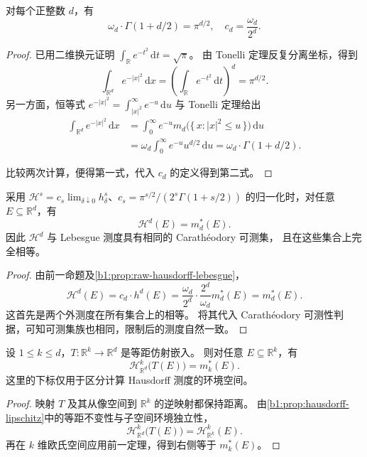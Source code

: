 \begin{proposition}[整数维归一化]\label{b1:prop:hausdorff-normalization}
对每个正整数 \(d\)，有
\[
 \omega_d\cdot \Gamma(1+d/2)=\pi^{d/2},\quad c_d=\frac{\omega_d}{2^d}.
\]
\end{proposition}
\begin{proof}
已用二维换元证明
\(\int_{\mathbb R}e^{-t^2}\,\mathrm dt=\sqrt\pi\)。
由 Tonelli 定理反复分离坐标，得到
\[
 \int_{\mathbb R^d}e^{-|x|^2}\,\mathrm dx
 =\left(\int_{\mathbb R}e^{-t^2}\,\mathrm dt\right)^d
 =\pi^{d/2}.
\]
另一方面，恒等式
\(e^{-|x|^2}=\int_{|x|^2}^\infty e^{-u}\,\mathrm du\)
与 Tonelli 定理给出
\[
 \begin{aligned}
 \int_{\mathbb R^d}e^{-|x|^2}\,\mathrm dx
 &=\int_0^\infty e^{-u}
      m_d\bigl(\{\,x:|x|^2\leq u\,\}\bigr)\,\mathrm du\\
 &=\omega_d\int_0^\infty e^{-u}u^{d/2}\,\mathrm du
 =\omega_d\cdot \Gamma(1+d/2).
 \end{aligned}
\]

比较两次计算，便得第一式，代入 \(c_d\) 的定义得到第二式。
\end{proof}

\begin{theorem}\label{b1:thm:hausdorff-lebesgue}
采用 \(\mathcal H^s=c_s\lim_{\delta\downarrow0}h^s_\delta\)、\(c_s=\pi^{s/2}/(2^s\Gamma(1+s/2))\) 的归一化时，对任意 \(E\subseteq\mathbb R^d\)，有
\[
 \mathcal H^d(E)=m_d^*(E).
\]
因此 \(\mathcal H^d\) 与 Lebesgue 测度具有相同的 Carathéodory 可测集，
且在这些集合上完全相等。
\end{theorem}
\begin{proof}
由前一命题及\cref{b1:prop:raw-hausdorff-lebesgue}，
\[
 \mathcal H^d(E)
 =c_d\cdot h^d(E)
 =\frac{\omega_d}{2^d}\cdot\frac{2^d}{\omega_d}m_d^*(E)
 =m_d^*(E).
\]
这首先是两个外测度在所有集合上的相等。
将其代入 Carathéodory 可测性判据，可知可测集族也相同，限制后的测度自然一致。
\end{proof}

\begin{corollary}\label{b1:cor:hausdorff-flat-subspace}
设 \(1\leq k\leq d\)，\(T\colon\mathbb R^k\to\mathbb R^d\) 是等距仿射嵌入。
则对任意 \(E\subseteq\mathbb R^k\)，有
\[
 \mathcal H^k_{\mathbb R^d}\bigl(T(E)\bigr)=m_k^*(E).
\]
这里的下标仅用于区分计算 Hausdorff 测度的环境空间。
\end{corollary}
\begin{proof}
映射 \(T\) 及其从像空间到 \(\mathbb R^k\) 的逆映射都保持距离。
由\cref{b1:prop:hausdorff-lipschitz}中的等距不变性与子空间环境独立性，
\[
 \mathcal H^k_{\mathbb R^d}\bigl(T(E)\bigr)
 =\mathcal H^k_{\mathbb R^k}(E).
\]
再在 \(k\) 维欧氏空间应用前一定理，得到右侧等于 \(m_k^*(E)\)。
\end{proof}

